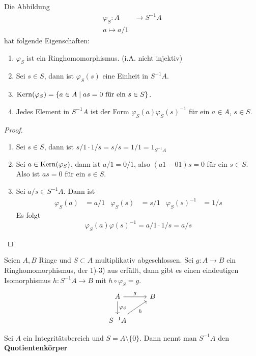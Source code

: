 	\begin{kor}
		Die Abbildung
		\begin{align*}
			\varphi_S:A&\to S^{-1}A\\
			a\mapsto a/1
		\end{align*}
		hat folgende Eigenschaften:
		\begin{enumerate}
			\item $\varphi_S$ ist ein Ringhomomorphismus. (i.A. nicht injektiv)
			\item Sei $s\in S$, dann ist $\varphi_S(s)$ eine Einheit in $S^{-1}A$.
			\item $\operatorname{Kern}(\varphi_S)=\{a\in A\mid\text{$as=0$ für ein $s\in S$}\}$.
			\item Jedes Element in $S^{-1}A$ ist der Form $\varphi_S(a)\varphi_S(s)^{-1}$ für ein $a\in A$, $s\in S$.
		\end{enumerate}
	\end{kor}
	\begin{proof}
		\begin{enumerate}
			\item Sei $s\in S$, dann ist $s/1\cdot 1/s=s/s=1/1=1_{S^{-1}A}$
			\item Sei $a\in\operatorname{Kern}(\varphi_S)$, dann ist $a/1=0/1$, also $(a1-01)s=0$ für ein $s\in S$. Also ist $as=0$ für ein $s\in S$.
			\item  Sei $a/s\in S^{-1}A$. Dann ist
			\begin{align*}
			\varphi_S(a)&=a/1& \varphi_S(s)&=s/1 &\varphi_S(s)^{-1}&=1/s
			\end{align*}
			Es folgt
			\[\varphi_S(a)\varphi(s)^{-1}=a/1\cdot 1/s=a/s\]
		\end{enumerate}
	\end{proof}

	\begin{satz}
		Seien $A,B$ Ringe und $S\subset A$ multiplikativ abgeschlossen. Sei $g:A\to B$ ein Ringhomomorphismus, der 1)-3) aus %
		erfüllt, dann gibt es einen eindeutigen Isomorphismus $h:S^{-1}A\to B$ mit $h\circ \varphi_S=g$.
			\[
			\begin{tikzcd}
				A \ar[r,"g"] \arrow[d,"\varphi_S"] & B\\
				S^{-1}A \arrow[ur,"h"']&
			\end{tikzcd}
			\]
	\end{satz}

	\begin{definition}
		Sei $A$ ein Integritätsbereich und $S=A\setminus \{0\}$. Dann nennt man $S^{-1}A$  den \textbf{Quotientenkörper}
	\end{definition}

